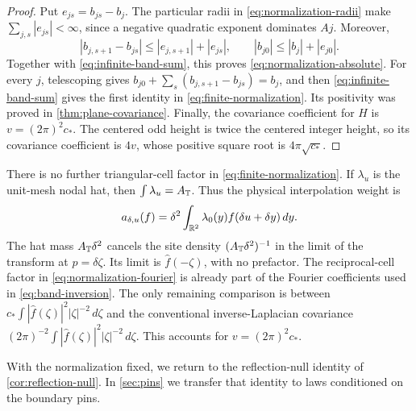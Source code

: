 \begin{proof}
Put \(e_{js}=b_{js}-b_j\). The particular radii in
\cref{eq:normalization-radii} make
\(\sum_{j,s}|e_{js}|<\infty\), since a negative quadratic exponent dominates
\(Aj\). Moreover,
\[
 |b_{j,s+1}-b_{js}|\le|e_{j,s+1}|+|e_{js}|,
 \qquad |b_{j0}|\le|b_j|+|e_{j0}|.
\]
Together with \cref{eq:infinite-band-sum}, this proves
\cref{eq:normalization-absolute}. For every \(j\), telescoping gives
\(b_{j0}+\sum_s(b_{j,s+1}-b_{js})=b_j\), and then
\cref{eq:infinite-band-sum} gives the first identity in
\cref{eq:finite-normalization}. Its positivity was proved in
\cref{thm:plane-covariance}. Finally, the covariance coefficient for \(H\) is
\(v=(2\pi)^2c_*\). The centered odd height is twice the centered integer
height, so its covariance coefficient is \(4v\), whose positive square root
is \(4\pi\sqrt{c_*}\).
\end{proof}

\begin{remark}
\label{rem:cell-area}
There is no further triangular-cell factor in
\cref{eq:finite-normalization}. If \(\lambda_u\) is the unit-mesh nodal hat,
then \(\int\lambda_u=A_{\mathbb T}\). Thus the physical interpolation weight is
\[
 a_{\delta,u}(f)
   =\delta^2\int_{\mathbb R^2}\lambda_0(y)f(\delta u+\delta y)\,dy.
\]
The hat mass \(A_{\mathbb T}\delta^2\) cancels the site density
\((A_{\mathbb T}\delta^2)^{-1}\) in the limit of the transform at
\(p=\delta\zeta\). Its limit is \(\widehat f(-\zeta)\), with no prefactor.
The reciprocal-cell factor in \cref{eq:normalization-fourier} is already part
of the Fourier coefficients used in \cref{eq:band-inversion}. The only
remaining comparison is between
\(c_*\int|\widehat f(\zeta)|^2|\zeta|^{-2}\,d\zeta\) and the conventional
inverse-Laplacian covariance
\((2\pi)^{-2}\int|\widehat f(\zeta)|^2|\zeta|^{-2}\,d\zeta\).
This accounts for \(v=(2\pi)^2c_*\).
\end{remark}

With the normalization fixed, we return to the reflection-null identity of
\cref{cor:reflection-null}. In \cref{sec:pins} we transfer that identity to
laws conditioned on the boundary pins.
